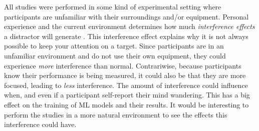 All studies were performed in some kind of experimental setting where participants are unfamiliar with their surroundings and/or equipment. 
Personal experience and the current environment determines how much \emph{interference effects} a distractor will generate \cite{Roda2006AttentionAgenda}. This interference effect explains why it is not always possible to keep your attention on a target.
Since participants are in an unfamiliar environment and do not use their own equipment, they could experience \emph{more} interference than normal. 
Contrariwise, because participants know their performance is being measured, it could also be that they are more focused, leading to \emph{less} interference.
The amount of interference could influence when, and even if a participant self-report their mind wandering. This has a big effect on the training of ML models and their results.
It would be interesting to perform the studies in a more natural environment to see the effects this interference could have.